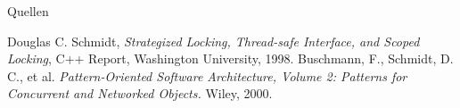 \documentclass[aspectratio=169,10pt]{beamer}
\begin{document}
\begin{frame}[allowframebreaks]{Quellen}
  \begin{thebibliography}{9}
    Douglas C. Schmidt,
    \emph{Strategized Locking, Thread-safe Interface, and Scoped Locking},
    C++ Report, Washington University, 1998.
    Buschmann, F., Schmidt, D. C., et al.
    \emph{Pattern-Oriented Software Architecture, Volume 2: Patterns for Concurrent and Networked Objects.}
    Wiley, 2000.
  \end{thebibliography}
\end{frame}
\end{document}
